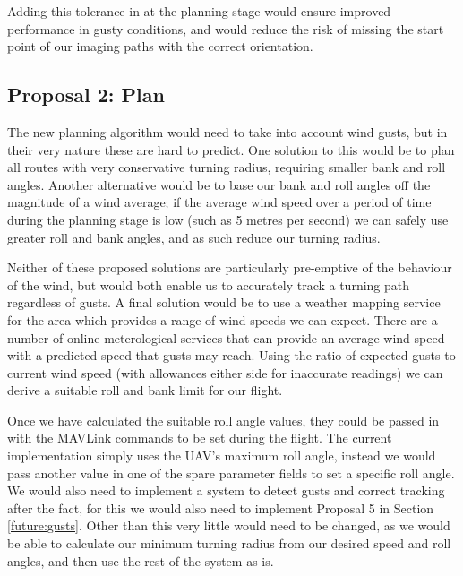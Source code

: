 Adding this tolerance in at the planning stage would ensure improved performance in gusty conditions, and would reduce the risk of missing the start point of our imaging paths with the correct orientation.  

\subsection{Proposal 2: Plan} 
\label{future:toleranceplan}
The new planning algorithm would need to take into account wind gusts, but in their very nature these are hard to predict. One solution to this would be to plan all routes with very conservative turning radius, requiring smaller bank and roll angles. Another alternative would be to base our bank and roll angles off the magnitude of a wind average; if the average wind speed over a period of time during the planning stage is low (such as 5 metres per second) we can safely use greater roll and bank angles, and as such reduce our turning radius. 

Neither of these proposed solutions are particularly pre-emptive of the behaviour of the wind, but would both enable us to accurately track a turning path regardless of gusts. A final solution would be to use a weather mapping service for the area which provides a range of wind speeds we can expect. There are a number of online meterological services that can provide an average wind speed with a predicted speed that gusts may reach. Using the ratio of expected gusts to current wind speed (with allowances either side for inaccurate readings) we can derive a suitable roll and bank limit for our flight.

Once we have calculated the suitable roll angle values, they could be passed in with the MAVLink commands to be set during the flight. The current implementation simply uses the UAV's maximum roll angle, instead we would pass another value in one of the spare parameter fields to set a specific roll angle. We would also need to implement a system to detect gusts and correct tracking after the fact, for this we would also need to implement Proposal 5 in Section \ref{future:gusts}. Other than this very little would need to be changed, as we would be able to calculate our minimum turning radius from our desired speed and roll angles, and then use the rest of the system as is. 

